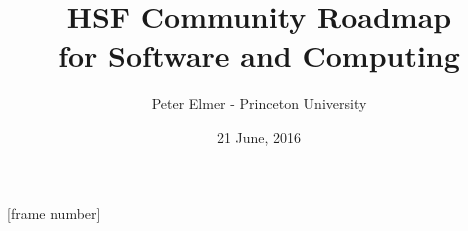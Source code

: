 \documentclass{beamer}
\title{HSF Community Roadmap \\
       for Software and Computing}
\author{Peter Elmer - Princeton University}
\date{21 June, 2016}
\begin{document}
\maketitle

%
%

[frame number]


%





%

%
%











\end{document}
